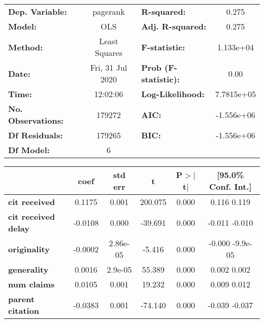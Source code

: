\begin{center}
\begin{tabular}{lclc}
\toprule
\textbf{Dep. Variable:}     &     pagerank     & \textbf{  R-squared:         } &       0.275    \\
\textbf{Model:}             &       OLS        & \textbf{  Adj. R-squared:    } &       0.275    \\
\textbf{Method:}            &  Least Squares   & \textbf{  F-statistic:       } &   1.133e+04    \\
\textbf{Date:}              & Fri, 31 Jul 2020 & \textbf{  Prob (F-statistic):} &       0.00     \\
\textbf{Time:}              &     12:02:06     & \textbf{  Log-Likelihood:    } &   7.7815e+05   \\
\textbf{No. Observations:}  &      179272      & \textbf{  AIC:               } &   -1.556e+06   \\
\textbf{Df Residuals:}      &      179265      & \textbf{  BIC:               } &   -1.556e+06   \\
\textbf{Df Model:}          &           6      & \textbf{                     } &                \\
\bottomrule
\end{tabular}
\begin{tabular}{lccccc}
                            & \textbf{coef} & \textbf{std err} & \textbf{t} & \textbf{P$>$$|$t$|$} & \textbf{[95.0\% Conf. Int.]}  \\
\midrule
\textbf{cit received}       &       0.1175  &        0.001     &   200.075  &         0.000        &         0.116     0.119       \\
\textbf{cit received delay} &      -0.0108  &        0.000     &   -39.691  &         0.000        &        -0.011    -0.010       \\
\textbf{originality}        &      -0.0002  &     2.86e-05     &    -5.416  &         0.000        &        -0.000  -9.9e-05       \\
\textbf{generality}         &       0.0016  &      2.9e-05     &    55.389  &         0.000        &         0.002     0.002       \\
\textbf{num claims}         &       0.0105  &        0.001     &    19.232  &         0.000        &         0.009     0.012       \\
\textbf{parent citation}    &      -0.0383  &        0.001     &   -74.140  &         0.000        &        -0.039    -0.037       \\

\end{tabular}
\end{center}
